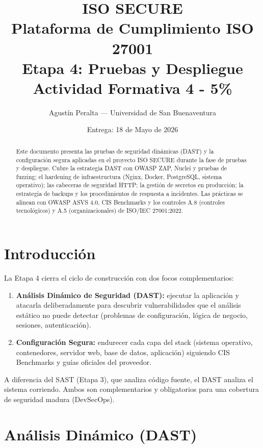 \documentclass[12pt,a4paper,oneside]{article}
\title{
  {\Huge \textbf{ISO SECURE}}\\
  {\LARGE Plataforma de Cumplimiento ISO 27001}\\[2ex]
  {\Large \textcolor{accent}{Etapa 4: Pruebas y Despliegue}}\\[1ex]
  {\small Actividad Formativa 4 - 5\%}
}
\author{Agustín Peralta --- Universidad de San Buenaventura}
\date{Entrega: 18 de Mayo de 2026}
\begin{document}
\maketitle

\begin{abstract}
Este documento presenta las pruebas de seguridad dinámicas (DAST) y la configuración segura aplicadas en el proyecto ISO SECURE durante la fase de pruebas y despliegue. Cubre la estrategia DAST con OWASP ZAP, Nuclei y pruebas de fuzzing; el hardening de infraestructura (Nginx, Docker, PostgreSQL, sistema operativo); las cabeceras de seguridad HTTP; la gestión de secretos en producción; la estrategia de backups y los procedimientos de respuesta a incidentes. Las prácticas se alinean con OWASP ASVS 4.0, CIS Benchmarks y los controles A.8 (controles tecnológicos) y A.5 (organizacionales) de ISO/IEC 27001:2022.
\end{abstract}

\tableofcontents
\newpage

\section{Introducción}

La Etapa 4 cierra el ciclo de construcción con dos focos complementarios:

\begin{enumerate}[leftmargin=*]
  \item \textbf{Análisis Dinámico de Seguridad (DAST):} ejecutar la aplicación y atacarla deliberadamente para descubrir vulnerabilidades que el análisis estático no puede detectar (problemas de configuración, lógica de negocio, sesiones, autenticación).
  \item \textbf{Configuración Segura:} endurecer cada capa del stack (sistema operativo, contenedores, servidor web, base de datos, aplicación) siguiendo CIS Benchmarks y guías oficiales del proveedor.
\end{enumerate}

A diferencia del SAST (Etapa 3), que analiza código fuente, el DAST analiza el sistema corriendo. Ambos son complementarios y obligatorios para una cobertura de seguridad madura (DevSecOps).

\section{Análisis Dinámico (DAST)}
\end{document}

